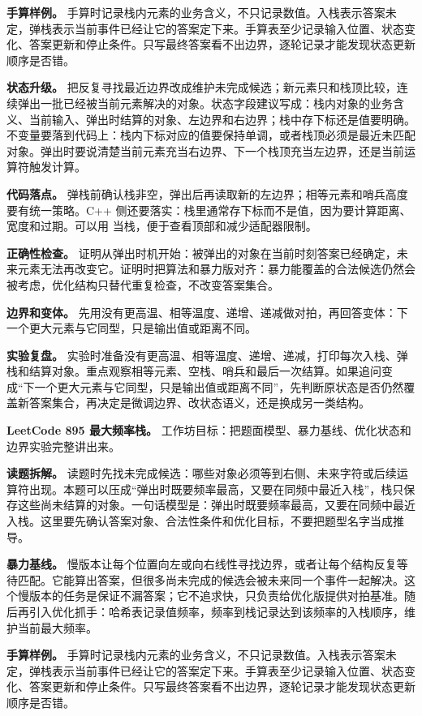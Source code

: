 \textbf{手算样例。} 手算时记录栈内元素的业务含义，不只记录数值。入栈表示答案未定，弹栈表示当前事件已经让它的答案定下来。手算表至少记录输入位置、状态变化、答案更新和停止条件。只写最终答案看不出边界，逐轮记录才能发现状态更新顺序是否错。

\textbf{状态升级。} 把反复寻找最近边界改成维护未完成候选；新元素只和栈顶比较，连续弹出一批已经被当前元素解决的对象。状态字段建议写成：栈内对象的业务含义、当前输入、弹出时结算的对象、左边界和右边界；栈中存下标还是值要明确。不变量要落到代码上：栈内下标对应的值要保持单调，或者栈顶必须是最近未匹配对象。弹出时要说清楚当前元素充当右边界、下一个栈顶充当左边界，还是当前运算符触发计算。

\textbf{代码落点。} 弹栈前确认栈非空，弹出后再读取新的左边界；相等元素和哨兵高度要有统一策略。C++ 侧还要落实：栈里通常存下标而不是值，因为要计算距离、宽度和过期。可以用  当栈，便于查看顶部和减少适配器限制。

\textbf{正确性检查。} 证明从弹出时机开始：被弹出的对象在当前时刻答案已经确定，未来元素无法再改变它。证明时把算法和暴力版对齐：暴力能覆盖的合法候选仍然会被考虑，优化结构只替代重复检查，不改变答案集合。

\textbf{边界和变体。} 先用没有更高温、相等温度、递增、递减做对拍，再回答变体：下一个更大元素与它同型，只是输出值或距离不同。

\textbf{实验复盘。} 实验时准备没有更高温、相等温度、递增、递减，打印每次入栈、弹栈和结算对象。重点观察相等元素、空栈、哨兵和最后一次结算。如果追问变成“下一个更大元素与它同型，只是输出值或距离不同”，先判断原状态是否仍然覆盖新答案集合，再决定是微调边界、改状态语义，还是换成另一类结构。

\noindent\textbf{LeetCode 895 最大频率栈。} 工作坊目标：把题面模型、暴力基线、优化状态和边界实验完整讲出来。

\textbf{读题拆解。} 读题时先找未完成候选：哪些对象必须等到右侧、未来字符或后续运算符出现。本题可以压成“弹出时既要频率最高，又要在同频中最近入栈”，栈只保存这些尚未结算的对象。一句话模型是：弹出时既要频率最高，又要在同频中最近入栈。这里要先确认答案对象、合法性条件和优化目标，不要把题型名字当成推导。

\textbf{暴力基线。} 慢版本让每个位置向左或向右线性寻找边界，或者让每个结构反复等待匹配。它能算出答案，但很多尚未完成的候选会被未来同一个事件一起解决。这个慢版本的任务是保证不漏答案；它不追求快，只负责给优化版提供对拍基准。随后再引入优化抓手：哈希表记录值频率，频率到栈记录达到该频率的入栈顺序，维护当前最大频率。

\textbf{手算样例。} 手算时记录栈内元素的业务含义，不只记录数值。入栈表示答案未定，弹栈表示当前事件已经让它的答案定下来。手算表至少记录输入位置、状态变化、答案更新和停止条件。只写最终答案看不出边界，逐轮记录才能发现状态更新顺序是否错。

